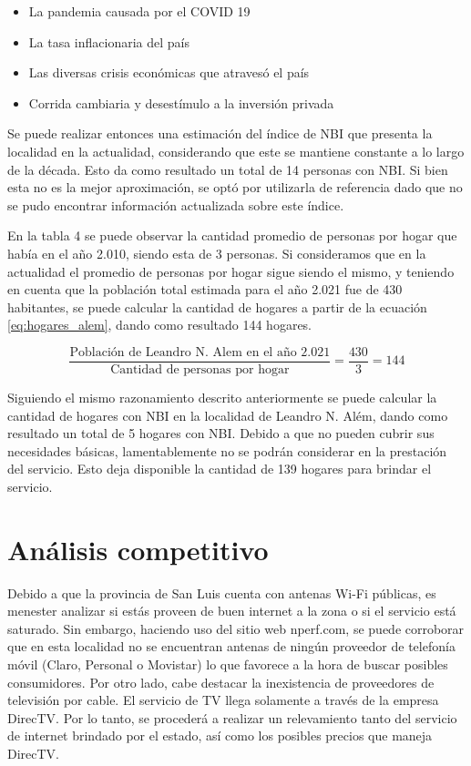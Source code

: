 \documentclass[11pt,a4paper]{article}
\begin{document}
\begin{itemize}
    \item La pandemia causada por el COVID 19
    \item La tasa inflacionaria del país
    \item Las diversas crisis económicas que atravesó el país
    \item Corrida cambiaria y desestímulo a la inversión privada
\end{itemize}

Se puede realizar entonces una estimación del índice de NBI que presenta la localidad en la actualidad, considerando que este se mantiene constante a lo largo de la década. 
Esto da como resultado un total de 14 personas con NBI. 
Si bien esta no es la mejor aproximación, se optó por utilizarla de referencia dado que no se pudo encontrar información actualizada sobre este índice.

En la tabla 4 se puede observar la cantidad promedio de personas por hogar que había en el año 2.010, siendo esta de 3 personas. 
Si consideramos que en la actualidad el promedio de personas por hogar sigue siendo el mismo, y teniendo en cuenta que la población total estimada para el año 2.021 fue de 430 habitantes, se puede calcular la cantidad de hogares a partir de la ecuación \ref{eq:hogares_alem}, dando como resultado 144 hogares.

\begin{equation}
    \frac{\text{Población de Leandro N. Alem en el año 2.021}}{\text{Cantidad de personas por hogar}}=\frac{430}{3}=144
    \label{eq:hogares_alem}
\end{equation}


Siguiendo el mismo razonamiento descrito anteriormente se puede calcular la cantidad de hogares con NBI en la localidad de Leandro N. Além, dando como resultado un total de 5 hogares con NBI. Debido a que no pueden cubrir sus necesidades básicas, lamentablemente no se podrán considerar en la prestación del servicio. 
Esto deja disponible la cantidad de 139 hogares para brindar el servicio.

\section{Análisis competitivo}

Debido a que la provincia de San Luis cuenta con antenas Wi-Fi públicas, es menester analizar si estás proveen de buen internet a la zona o si el servicio está saturado. 
Sin embargo, haciendo uso del sitio web nperf.com, se puede corroborar que en esta localidad no se encuentran antenas de ningún proveedor de telefonía móvil (Claro, Personal o Movistar) lo que favorece a la hora de buscar posibles consumidores. 
Por otro lado, cabe destacar la inexistencia de proveedores de televisión por cable. 
El servicio de TV llega solamente a través de la empresa DirecTV. 
Por lo tanto, se procederá a realizar un relevamiento tanto del servicio de internet brindado por el estado, así como los posibles precios que maneja DirecTV.
\end{document}
